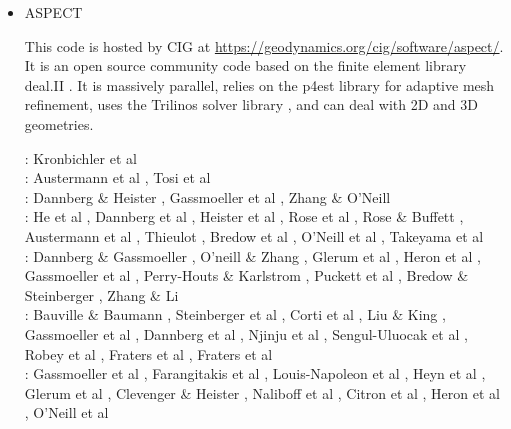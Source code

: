 \begin{itemize}
\item {\codefont ASPECT} 

This code is hosted by CIG at \url{https://geodynamics.org/cig/software/aspect/}. 
It is an open source community code based on the finite element library deal.II \cite{bahk07,arbc19,arbd20}. 
It is massively parallel, relies on the p4est library for adaptive mesh refinement,
uses the Trilinos solver library \cite{hewi12}, and can deal with 2D and 3D geometries. 

\begin{scriptsize}
\noindent
\twothousandtwelve:
Kronbichler et al \cite{krhb12}\\
\twothousandfifteen:
Austermann et al \cite{aupm15}, Tosi et al \cite{tosn15}\\
\twothousandsixteen:
Dannberg \& Heister \cite{dahe16}, Gassmoeller et al \cite{gadb16}, Zhang \& O'Neill \cite{zhon16}\\
\twothousandseventeen:
He et al \cite{hepb17}, Dannberg et al \cite{daef17}, Heister et al \cite{hedg17},
Rose et al \cite{robh17}, Rose \& Buffett \cite{robu17}, Austermann et al \cite{aumh17},
Thieulot \cite{thie17}, Bredow et al \cite{brsg17}, O'Neill et al \cite{onmz17},
Takeyama et al \cite{tasm17}\\
\twothousandeighteen:
Dannberg \& Gassmoeller \cite{daga18}, O'neill \& Zhang \cite{onzh18}, 
Glerum et al \cite{gltf18}, Heron et al \cite{heps18}, Gassmoeller et al \cite{galh18}, 
Perry-Houts \& Karlstrom \cite{peka18}, Puckett et al \cite{puth18},
Bredow \& Steinberger \cite{brst18b}, Zhang \& Li \cite{zhli18}\\
\twothousandnineteen:
Bauville \& Baumann \cite{baba19}, Steinberger et al \cite{stbl19}, Corti et al \cite{cocf19},
Liu \& King \cite{liki19}, Gassmoeller et al \cite{galb19}, Dannberg et al \cite{dagg19},
Njinju et al \cite{njas19}, Sengul-Uluocak et al \cite{sepg19}, Robey et al \cite{ropu19},
Fraters et al \cite{frtv19}, Fraters et al \cite{frbt19}\\
\twothousandtwenty:
Gassmoeller et al \cite{gadb20}, Farangitakis et al \cite{fahm20}, 
Louis-Napoleon et al \cite{logb20}, Heyn et al \cite{hect20}, Glerum et al \cite{glbs20},
Clevenger \& Heister \cite{clhe20}, Naliboff et al \cite{nagb20}, Citron et al \cite{cilw20},
Heron et al \cite{hemn20}, O'Neill et al \cite{onlw20}
\end{scriptsize}


\end{itemize}
